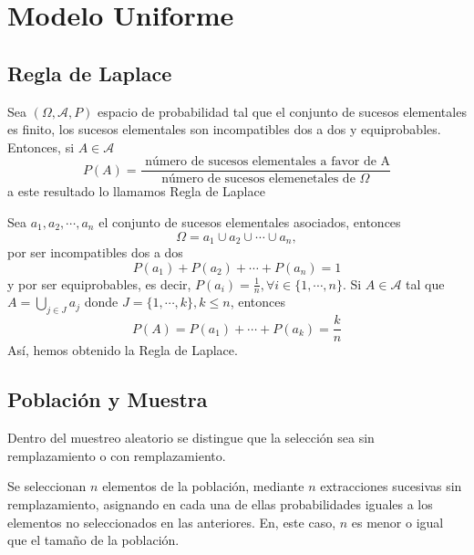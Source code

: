\chapter{Modelo Uniforme}

\section{Regla de Laplace}

\begin{prop}
  Sea $(\Omega, \mathcal{A}, P )$ espacio de probabilidad tal que el conjunto de sucesos elementales es finito, los sucesos elementales son incompatibles dos a dos y equiprobables. Entonces, si $A \in \mathcal{A}$
  \[ 
    P(A) = \frac{\text{ número de sucesos elementales a favor de A}}{\text{número de sucesos elemenetales de $\Omega$}} 
  \] 
  a este resultado lo llamamos Regla de Laplace
\end{prop}

\begin{dem}
  Sea $a_{1}, a_{2}, \cdots, a_{n}$ el conjunto de sucesos elementales asociados, entonces
  \[
    \Omega = a_{1} \cup a_{2} \cup \cdots \cup a_{n},
  \]
  por ser incompatibles dos a dos
  \[ 
    P(a_{1}) + P(a_{2}) + \cdots + P(a_{n}) = 1
  \] 
  y por ser equiprobables, es decir, $P(a_{i}) = \frac{1}{n}, \forall i \in \{  1, \cdots, n \}$. Si $A \in \mathcal{A}$ tal que $A = \bigcup_{j \in J} a_{j}$ donde $ J = \{ 1, \cdots, k \}, k \leq n$, entonces
  \[ 
    P(A) = P(a_{1}) + \cdots + P(a_{k}) = \frac{k}{n} 
  \] 
  Así, hemos obtenido la Regla de Laplace.

\end{dem}

\section{Población y Muestra}

\begin{note}
  Dentro del muestreo aleatorio se distingue que la selección sea sin remplazamiento o con remplazamiento.
\end{note}

\begin{defn}
  Se seleccionan $n$ elementos de la población, mediante $n$ extracciones sucesivas sin remplazamiento, asignando en cada una de ellas probabilidades iguales a los elementos no seleccionados en las anteriores. En, este caso, $n$ es menor o igual que el tamaño de la población.
\end{defn}

